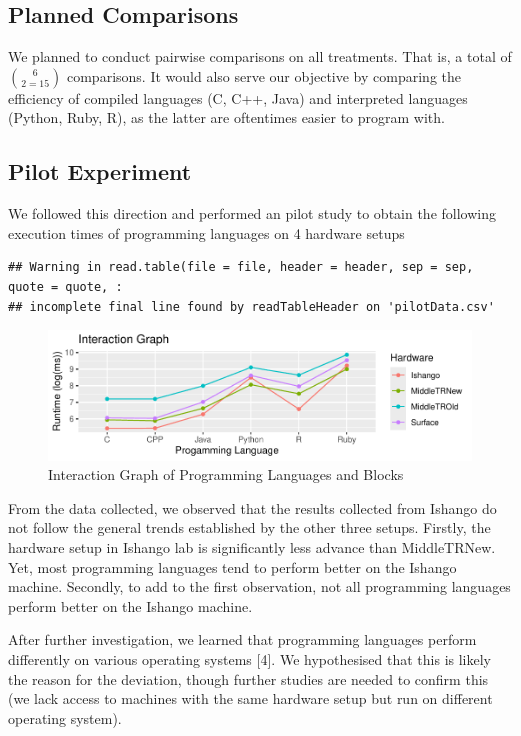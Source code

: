 \documentclass[12pt,halfline,a4paper,]{ouparticle}
\begin{document}
\subsection{Planned Comparisons}\label{planned-comparisons}

We planned to conduct pairwise comparisons on all treatments. That is, a
total of \(6 \choose 2 = 15\) comparisons. It would also serve our
objective by comparing the efficiency of compiled languages (C, C++,
Java) and interpreted languages (Python, Ruby, R), as the latter are
oftentimes easier to program with.

\subsection{Pilot Experiment}\label{pilot-experiment}

We followed this direction and performed an pilot study to obtain the
following execution times of programming languages on 4 hardware setups

\begin{verbatim}
## Warning in read.table(file = file, header = header, sep = sep, quote = quote, :
## incomplete final line found by readTableHeader on 'pilotData.csv'
\end{verbatim}

\begin{figure}[H]
\includegraphics[width=1\linewidth]{skeleton_files/figure-latex/figPilot-1} \caption{Interaction Graph of Programming Languages and Blocks}\label{fig:figPilot}
\end{figure}

From the data collected, we observed that the results collected from
Ishango do not follow the general trends established by the other three
setups. Firstly, the hardware setup in Ishango lab is significantly less
advance than MiddleTRNew. Yet, most programming languages tend to
perform better on the Ishango machine. Secondly, to add to the first
observation, not all programming languages perform better on the Ishango
machine.

After further investigation, we learned that programming languages
perform differently on various operating systems {[}4{]}. We
hypothesised that this is likely the reason for the deviation, though
further studies are needed to confirm this (we lack access to machines
with the same hardware setup but run on different operating system).
\end{document}
